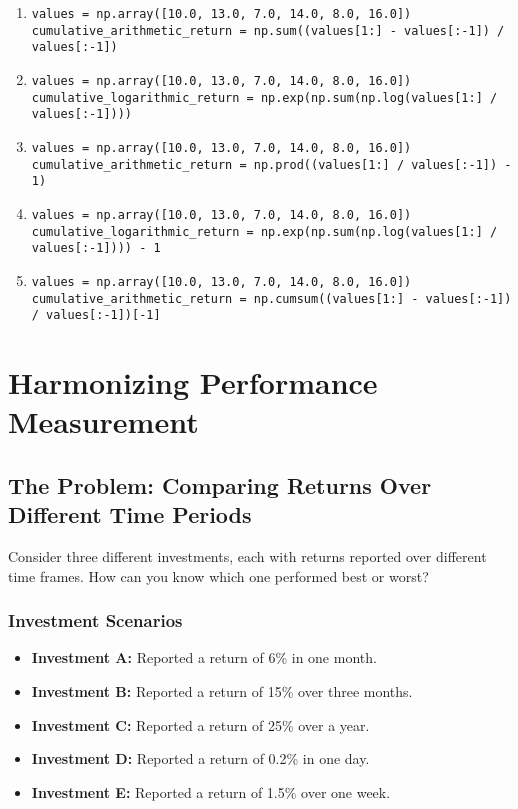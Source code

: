 \documentclass{article}
\begin{document}
\begin{enumerate}
    \begin{enumerate}
        \item \texttt{values = np.array([10.0, 13.0, 7.0, 14.0, 8.0, 16.0]) \\
        cumulative\_arithmetic\_return = np.sum((values[1:] - values[:-1]) / values[:-1])}
        \item \texttt{values = np.array([10.0, 13.0, 7.0, 14.0, 8.0, 16.0]) \\
        cumulative\_logarithmic\_return = np.exp(np.sum(np.log(values[1:] / values[:-1])))}
        \item \texttt{values = np.array([10.0, 13.0, 7.0, 14.0, 8.0, 16.0]) \\
        cumulative\_arithmetic\_return = np.prod((values[1:] / values[:-1]) - 1)}
        \item \texttt{values = np.array([10.0, 13.0, 7.0, 14.0, 8.0, 16.0]) \\
        cumulative\_logarithmic\_return = np.exp(np.sum(np.log(values[1:] / values[:-1]))) - 1}
        \item \texttt{values = np.array([10.0, 13.0, 7.0, 14.0, 8.0, 16.0]) \\
        cumulative\_arithmetic\_return = np.cumsum((values[1:] - values[:-1]) / values[:-1])[-1]}
    \end{enumerate}

\end{enumerate}

\section{Harmonizing Performance Measurement}

\subsection{The Problem: Comparing Returns Over Different Time Periods}

Consider three different investments, each with returns reported over different time frames. How can you know which one performed best or worst?

\subsubsection*{Investment Scenarios}

\begin{itemize}
    \item \textbf{Investment A:} Reported a return of 6\% in one month.
    \item \textbf{Investment B:} Reported a return of 15\% over three months.
    \item \textbf{Investment C:} Reported a return of 25\% over a year.
    \item \textbf{Investment D:} Reported a return of 0.2\% in one day.
    \item \textbf{Investment E:} Reported a return of 1.5\% over one week.
\end{itemize}
\end{document}

